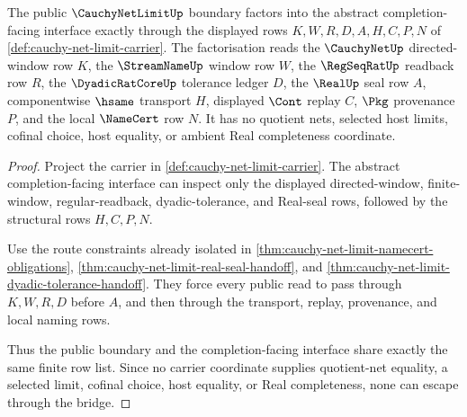 \begin{theorem}
\label{thm:cauchy-net-limit-abstract-completion-bridge}
The public $\CauchyNetLimitUp$ boundary factors into the abstract completion-facing interface exactly through the displayed rows $K,W,R,D,A,H,C,P,N$ of \autoref{def:cauchy-net-limit-carrier}. The factorisation reads the $\CauchyNetUp$ directed-window row $K$, the $\StreamNameUp$ window row $W$, the $\RegSeqRatUp$ readback row $R$, the $\DyadicRatCoreUp$ tolerance ledger $D$, the $\RealUp$ seal row $A$, componentwise $\hsame$ transport $H$, displayed $\Cont$ replay $C$, $\Pkg$ provenance $P$, and the local $\NameCert$ row $N$. It has no quotient nets, selected host limits, cofinal choice, host equality, or ambient Real completeness coordinate.
\end{theorem}
\begin{proof}
Project the carrier in \autoref{def:cauchy-net-limit-carrier}. The abstract completion-facing interface can inspect only the displayed directed-window, finite-window, regular-readback, dyadic-tolerance, and Real-seal rows, followed by the structural rows $H,C,P,N$.

Use the route constraints already isolated in \autoref{thm:cauchy-net-limit-namecert-obligations}, \autoref{thm:cauchy-net-limit-real-seal-handoff}, and \autoref{thm:cauchy-net-limit-dyadic-tolerance-handoff}. They force every public read to pass through $K,W,R,D$ before $A$, and then through the transport, replay, provenance, and local naming rows.

Thus the public boundary and the completion-facing interface share exactly the same finite row list. Since no carrier coordinate supplies quotient-net equality, a selected limit, cofinal choice, host equality, or Real completeness, none can escape through the bridge.
\end{proof}


